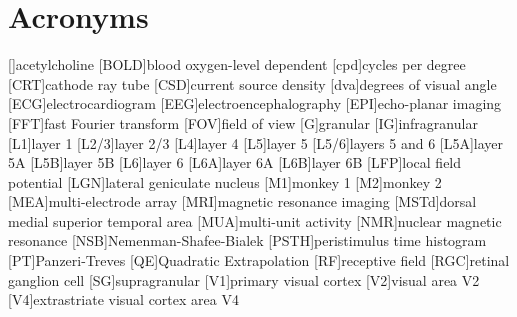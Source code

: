     \chapter*{Acronyms}
    \begin{acronym}[BOLD]
        []{acetylcholine}
        [BOLD]{blood oxygen-level dependent}
        [cpd]{cycles per degree}
        [CRT]{cathode ray tube}
        [CSD]{current source density}
        [dva]{degrees of visual angle}
        [ECG]{electrocardiogram}
        [EEG]{electroencephalography}
        [EPI]{echo-planar imaging}
        [FFT]{fast Fourier transform}
        [FOV]{field of view}
        [G]{granular}
        [IG]{infragranular}
        [L1]{layer 1}
        [L2/3]{layer 2/3}
        [L4]{layer 4}
        [L5]{layer 5}
        [L5/6]{layers 5 and 6}
        [L5A]{layer 5A}
        [L5B]{layer 5B}
        [L6]{layer 6}
        [L6A]{layer 6A}
        [L6B]{layer 6B}
        [LFP]{local field potential}
        [LGN]{lateral geniculate nucleus}
        [M1]{monkey 1}
        [M2]{monkey 2}
        [MEA]{multi-electrode array}
        [MRI]{magnetic resonance imaging}
        [MSTd]{dorsal medial superior temporal area}
        [MUA]{multi-unit activity}
        [NMR]{nuclear magnetic resonance}
        [NSB]{{N}emenman-{S}hafee-{B}ialek}
        [PSTH]{peristimulus time histogram}
        [PT]{{P}anzeri-{T}reves}
        [QE]{Quadratic Extrapolation}
        [RF]{receptive field}
        [RGC]{retinal ganglion cell}
        [SG]{supragranular}
        [V1]{primary visual cortex}
        [V2]{visual area \acs{V2}}
        [V4]{extrastriate visual cortex area \acs{V4}}
    \end{acronym}                     
\endgroup

\cleardoublepage
